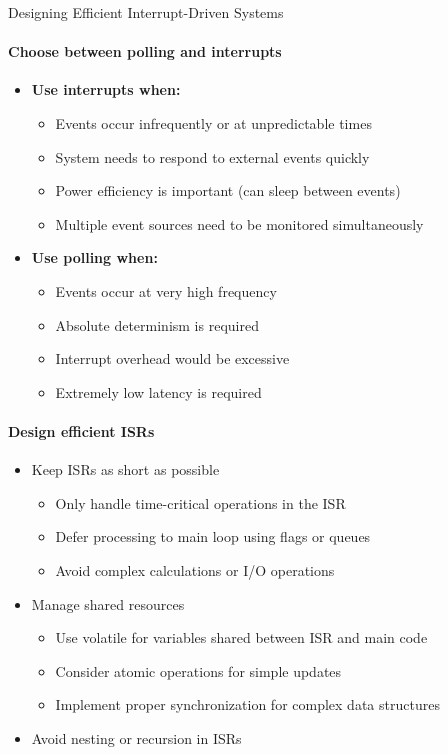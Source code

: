 \begin{KR}{Designing Efficient Interrupt-Driven Systems}
\paragraph{Choose between polling and interrupts}
\begin{itemize}
    \item \textbf{Use interrupts when:}
    \begin{itemize}
        \item Events occur infrequently or at unpredictable times
        \item System needs to respond to external events quickly
        \item Power efficiency is important (can sleep between events)
        \item Multiple event sources need to be monitored simultaneously
    \end{itemize}
    \item \textbf{Use polling when:}
    \begin{itemize}
        \item Events occur at very high frequency
        \item Absolute determinism is required
        \item Interrupt overhead would be excessive
        \item Extremely low latency is required
    \end{itemize}
\end{itemize}

\paragraph{Design efficient ISRs}
\begin{itemize}
    \item Keep ISRs as short as possible
    \begin{itemize}
        \item Only handle time-critical operations in the ISR
        \item Defer processing to main loop using flags or queues
        \item Avoid complex calculations or I/O operations
    \end{itemize}
    \item Manage shared resources
    \begin{itemize}
        \item Use volatile for variables shared between ISR and main code
        \item Consider atomic operations for simple updates
        \item Implement proper synchronization for complex data structures
    \end{itemize}
    \item Avoid nesting or recursion in ISRs
\end{itemize}


\end{KR}
